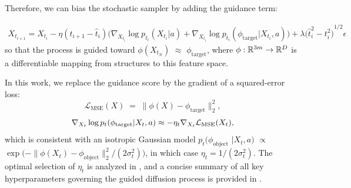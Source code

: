 Therefore, we can bias the stochastic sampler by adding the guidance term:

\begin{equation}
    \begin{split}
        X_{t_{i+1}} = X_{t_i} - \eta (t_{i+1} - \hat{t}_i) \bigl( \nabla_{X_{t_i}} \log p_{t_i}(X_{t_i} | a) 
        + \nabla_{X_{t_i}} \log p_{t_i}(\phi_{\text{target}} | X_{t_i}, a) \bigr) + \lambda {\bigl( \hat{t}_i^2 - t_i^2 \bigr)}^{1/2} \epsilon
    \end{split}
    \label{eq:af3-guided}
\end{equation}
so that the process is guided toward $\phi(X_{t_N})$ $\approx$ $\phi_{\text{target}}$, where $\phi: \mathbb{R}^{3m} \to \mathbb{R}^{D}$ is a differentiable mapping from structures to this feature space.

In this work, we replace the guidance score by the gradient of a squared-error loss:
\begin{equation}
    \mathcal{L}_{\text{MSE}}(X) \;=\; \bigl\|\phi(X)-\phi_{\text{target}}\bigr\|_2^2,
\end{equation}
\begin{equation}
    \nabla_{X_t} \log p_t(\phi_{\text{target}} | X_t, a) \approx - \eta_t \nabla_{X_t} \mathcal{L}_{\text{MSE}}(X_t),
\end{equation}
which is consistent with an isotropic Gaussian model $p_t \bigl( \phi_{\text{object}} $ $| X_t,a \bigr)$ $\propto$ $\exp \big( - \| \phi(X_t) - \phi_{\text{object}} \|_2^2 / ( 2 \sigma_t^2 ) \big)$, in which case $\eta_t = 1/(2\sigma_t^2)$. 
The optimal selection of $\eta_t$ is analyzed in , and a concise summary of all key hyperparameters governing the guided diffusion process is provided in .
